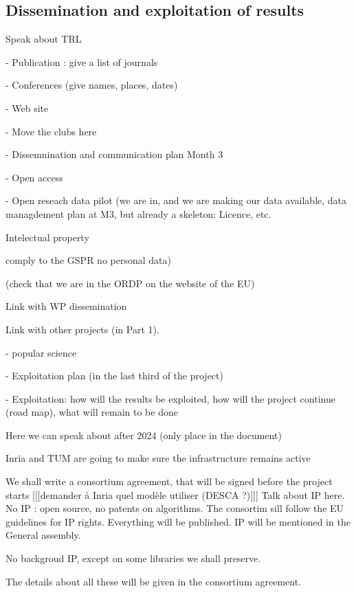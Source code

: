 \subsection{Dissemination and exploitation of results}

{\color{red} Speak about TRL}

- Publication : give a list of journals 

- Conferences (give names, places, dates)

- Web site

- Move the clubs here

- Dissemnination and communication plan Month 3

- Open access

- Open reseach data pilot (we are in, and we are making our data available,
data managdement plan at M3, but already a skeleton: Licence, etc.

Intelectual property

comply to the GSPR no personal data)

(check that we are in the ORDP on the website of the EU)

Link with WP dissemination

Link with other projects (in Part 1).

- popular science

- Exploitation plan (in the last third of the project)

- Exploitation: how will the results be exploited, how will the project
continue (road map), what will remain to be done

Here we can speak about after 2024 (only place in the document)

Inria and TUM are going to make sure the infrastructure remains active

We shall write a consortium agreement, that will be signed before the
project starts [[[demander à Inria quel modèle utiliser (DESCA ?)]]]
Talk about IP here. No IP : open source, no patents on algorithms.
The consortim sill follow the EU guidelines for IP rights.
Everything will be published. IP will be mentioned in the General assembly.



No backgroud IP, except on some libraries
we shall preserve.

The details about all these will be given in the consortium agreement.
 







